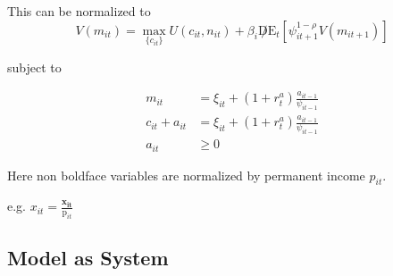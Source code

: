 \documentclass[titlepage]{\econtex}\providecommand{\texname}{BufferStockTheory}
\begin{document}
This can be normalized to \\


$$ V(m_{it}) = \max_{\{c_{it}\}} { U(c_{it}, n_{it}) + \beta_{i}\not D \mathrm{E}_{t}[\psi_{it+1}^{1-\rho} V(m_{it+1})]}$$

 subject to 
 
 \begin{align*}
m_{i t} &=  \xi_{it}  + (1+r^{a}_{t}) \frac{a_{i t-1}}{\psi_{it-1}} \\
 c_{i t}  + a_{i t} &= \xi_{it}  + (1+r^{a}_{t}) \frac{a_{i t-1}}{\psi_{it-1}} \\
 a_{it} &\geq 0 
 \end{align*}
 
 Here non boldface variables are normalized by permanent income $\mathit{p_{it}}$. 

e.g. $x_{it} = \frac{\mathbf{x_{it}}}{\pmb{\mathrm{p}}_{it}}$




\hypertarget{Model as System}{}
\subsection{Model as System}
\end{document}
